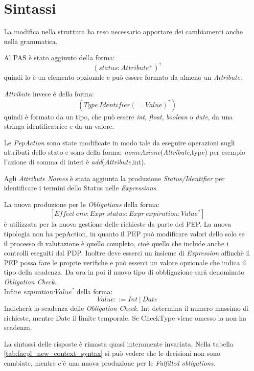 \section{Sintassi}
\label{sec:SintassiNew}
La modifica nella struttura ha reso necessario apportare dei cambiamenti anche nella grammatica.\par
Al \ac{PAS} è stato aggiunto \status della forma:
$$(status: Attribute^+)^?$$
quindi lo \status è un elemento opzionale e può essere formato da almeno un \emph{ Attribute}.

\emph{ Attribute} invece è della forma:
$$(Type\ Identifier (= Value)^?)$$
quindi è formato da un tipo, che può essere \emph{int}, \emph{float}, \emph{boolean} o \emph{date}, da una stringa
identificatrice e da un valore.\par
Le \emph{PepAction} sono state modificate in modo tale da eseguire operazioni sugli attributi dello stato
e sono della forma: \emph{nomeAzione}(\emph{Attribute},type)
per esempio l'azione di somma di interi è \emph{add}(\emph{Attribute},int).\par
Agli \emph{Attribute Names} è stata aggiunta la produzione \textit{Status/Identifier} per identificare i
termini dello Status nelle \emph{Expressions}.\par
La nuova produzione per le \emph{Obligations} della forma:
$$[Effect\ env:Expr\  status:Expr \ expiration:Value^?]$$
è utilizzata per la nuova gestione delle richieste da parte del \ac{PEP}. La nuova tipologia
non ha pepAction, in quanto il \ac{PEP} può modificare valori dello \status solo se il processo di valutazione è quello
completo, cioè quello che include anche i controlli eseguiti dal \ac{PDP}. Inoltre deve esserci un insieme di \emph{Expression}
affinchè il \ac{PEP} possa fare le proprie verifiche e può esserci un valore opzionale che indica il tipo della scadenza.
Da ora in poi il nuovo tipo di obbligazione sarà denominato \emph{Obligation Check.}\\
Infine \emph{expiration:$Value^?$} della forma:
$$Value ::= Int\ |\ Date$$
Indicherà la scadenza delle \emph{Obligation Check}. Int determina il numero massimo di richieste, mentre Date
il limite temporale. Se CheckType viene omesso la \eobligation non ha scadenza.
{\label{Sintassi ausiliaria di FACPL Aggiornata}}
{\label{Sintassi di FACPL Aggiornata}}

La sintassi delle risposte è rimasta quasi interamente invariata. Nella tabella \ref{tab:facpl_new_context_syntax}
si può vedere che le decisioni non sono cambiate, mentre c'è una nuova produzione per le \emph{Fulfilled obligations}.

